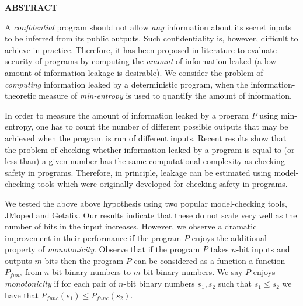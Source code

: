 \newpage
{}

\centerline{\bf \large ABSTRACT}
\vskip 10mm 

A \emph{confidential} program should not allow \emph{any} information about its secret inputs to be inferred from its public outputs. Such confidentiality is, however, difficult to achieve in practice. Therefore, it has been proposed in literature to evaluate security of programs by computing the \emph{amount} of information leaked (a low amount of information leakage is desirable). 
We consider the problem of \emph{computing} 
information leaked by a deterministic  program,  when the information-theoretic measure of \emph{min-entropy} is used to quantify the amount of information. 

In order to measure the amount of  information leaked by a program $P$ using min-entropy, one has to count the number of different possible outputs that may be achieved when the program is run of different inputs. Recent results show that the problem of checking whether information leaked by a program is equal to  (or less than) a given number has the same computational complexity as checking safety in  programs.  Therefore, in principle,   leakage can be estimated using model-checking tools which were  originally developed for checking safety in programs.  
 
We tested the above above hypothesis using two popular model-checking tools, JMoped and Getafix. Our results indicate that these   do not scale very well as  the number of bits
in the input increases.  However, we observe a dramatic improvement in their performance  if the program $P$ enjoys the additional property of \emph{monotonicity}. Observe that if the program $P$ takes $n$-bit inputs and outputs $m$-bits then the program $P$ can be considered as a function a function $P_{func}$ from $n$-bit binary numbers to $m$-bit binary numbers.    We say $P$ enjoys   
\emph{monotonicity}  if for each pair of $n$-bit  binary numbers $s_1, s_2$  such that  $s_1\leq s_2$ we have that $P_{func}(s_1) \leq P_{func}(s_2).$


  